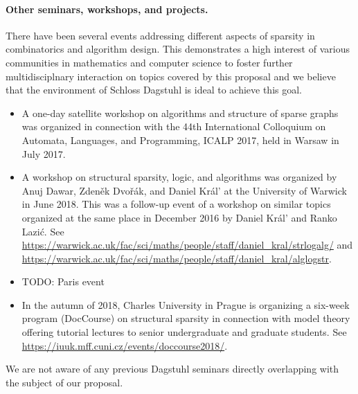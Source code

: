 \paragraph*{Other seminars, workshops, and projects.}
There have been several events addressing different aspects of sparsity in combinatorics and algorithm design.
This demonstrates a high interest of various communities in mathematics and computer science
to foster further multidisciplnary interaction on topics covered by this proposal and
we believe that the environment of Schloss Dagstuhl is ideal to achieve this goal.
\begin{itemize}
\item A one-day satellite workshop on algorithms and structure of sparse graphs was organized in connection with the 44th International Colloquium on Automata, Languages, and Programming, ICALP 2017, held in Warsaw in July 2017.
\item A workshop on structural sparsity, logic, and algorithms was organized by Anuj Dawar, Zden\v ek Dvo\v{r}\'ak, and Daniel Kr\'al' at the University of Warwick in June 2018. This was a follow-up event of a workshop on similar topics organized at the same place in December 2016 by Daniel Kr\'al' and Ranko Lazi\'c. See \url{https://warwick.ac.uk/fac/sci/maths/people/staff/daniel_kral/strlogalg/}
and \url{https://warwick.ac.uk/fac/sci/maths/people/staff/daniel_kral/alglogstr}.
\item TODO: Paris event
\item In the autumn of 2018, Charles University in Prague is organizing a six-week program (DocCourse) on structural sparsity in connection with model theory offering tutorial lectures to senior undergraduate and graduate students. See \url{https://iuuk.mff.cuni.cz/events/doccourse2018/}.
\end{itemize}
We are not aware of any previous Dagstuhl seminars directly overlapping with the subject of our proposal.
